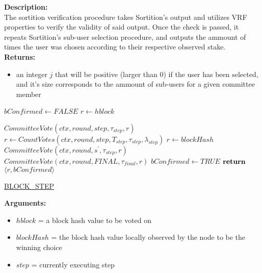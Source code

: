 \documentclass[10pt,a4paper]{article}
\begin{document}
\noindent \textbf{Description:}\\
The sortition verification procedure takes Sortition's output and utilizes VRF properties to verify the validity of said output.
Once the check is passed, it repeats Sortition's sub-user selection procedure, and outputs the ammount of times the user was chosen
according to their respective observed stake.\\

\noindent \textbf{Returns:}
\begin{itemize}
    \item an integer $j$ that will be positive (larger than 0) if the user has been selected, and it's size corresponds to the ammount
    of sub-users for a given committee member
  \end{itemize}


\begin{algorithm}
    \begin{algorithmic}[H]
        \State $bConfirmed \gets FALSE$
        \State $r \gets hblock$

        \State $CommitteeVote(ctx, round, step, \tau_{step}, r)$
        \State $r \gets CountVotes(ctx,round,step,T_{step},\tau_{step},\lambda_{step})$
            \State $r \gets blockHash$
                \State $CommitteeVote(ctx, round, s^\prime, \tau_{step}, r)$
            \EndFor
                \State $CommitteeVote(ctx, round, FINAL, \tau_{final}, r)$
            \EndIf
            \State $bConfirmed \gets TRUE$
        \EndIf
        $\Return$ $ \langle r, bConfirmed \rangle$
    \EndFunction
    \end{algorithmic}
    \caption{\underline{BLOCK\_STEP}}
\end{algorithm}

\noindent \textbf{Arguments:}
\begin{itemize}
    \item $hblock$ = a block hash value to be voted on
    \item $blockHash$ = the block hash value locally observed by the node to be the winning choice
    \item $step$ = currently executing step
  \end{itemize}
\end{document}
